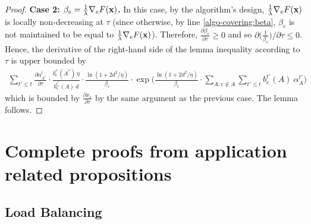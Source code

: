 \begin{proof}
	\textbf{Case 2: $\beta_{e} = \frac{1}{\lambda} \nabla_{e} F(\mathbf{x})$.}
	In this case, by the algorithm's design, $\frac{1}{\lambda} \nabla_{e} F(\mathbf{x})$ is locally non-decreasing at $\tau$ (since otherwise,
	by line \ref{algo-covering:beta}, $\beta_{e}$ is not maintained to be equal to $\frac{1}{\lambda} \nabla_{e} F(\mathbf{x})$).
	Therefore, $\frac{\partial \beta_{e}}{\partial \tau} \geq 0$ and so $\partial \bigl(\frac{1}{\beta_{e}}\bigr)/\partial \tau \leq 0$.
	Hence, the derivative of the right-hand side of the lemma inequality according to $\tau$ is upper bounded by
	\begin{align*}
	\sum_{t' \le t} \frac{\partial \alpha^{t}_{A^{*}}}{\partial \tau} \cdot
		\frac{b^{t'}_{e}(A^{*}) \ \eta}{b^{t_{e}^{*}}_{e}(A) \ d} \cdot \frac{\ln(1+2d^{2}/\eta)}{\beta_{e}}
			\cdot \exp\biggl( \frac{\ln(1+2d^{2}/\eta)}{\beta_{e} } \cdot \sum_{A: e \notin A} \sum_{t' \le t} b^{t'}_{e}(A)\ \alpha^{t'}_{A} \biggr)
	\end{align*}
	which is bounded by $\frac{\partial x_{e}}{\partial \tau}$ by the same argument as the previous case. The lemma follows.
\end{proof}


\clearpage

\section{Complete proofs from application related
propositions} \label{sec:appix-proofs}
\setcounter{theorem}{0}

\subsection{Load Balancing}

